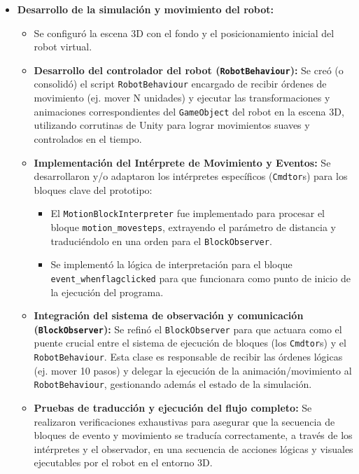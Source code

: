 \begin{itemize}
\begin{itemize}
	\item \textbf{Desarrollo de la simulación y movimiento del robot:}
	\begin{itemize}
		\item Se configuró la escena 3D con el fondo y el posicionamiento inicial del robot virtual. 
		\item \textbf{Desarrollo del controlador del robot (\texttt{RobotBehaviour}):} Se creó (o consolidó) el script \texttt{RobotBehaviour} encargado de recibir órdenes de movimiento (ej. mover N unidades) y ejecutar las transformaciones y animaciones correspondientes del \texttt{GameObject} del robot en la escena 3D, utilizando corrutinas de Unity para lograr movimientos suaves y controlados en el tiempo.
		\item \textbf{Implementación del Intérprete de Movimiento y Eventos:} Se desarrollaron y/o adaptaron los intérpretes específicos (\texttt{Cmdtor}s) para los bloques clave del prototipo:
		\begin{itemize}
			\item El \texttt{MotionBlockInterpreter} fue implementado para procesar el bloque \texttt{motion\_movesteps}, extrayendo el parámetro de distancia y traduciéndolo en una orden para el \texttt{BlockObserver}.
			\item Se implementó la lógica de interpretación para el bloque \texttt{event\_whenflagclicked} para que funcionara como punto de inicio de la ejecución del programa.
		\end{itemize}
		\item \textbf{Integración del sistema de observación y comunicación (\texttt{BlockObserver}):} Se refinó el \texttt{BlockObserver} para que actuara como el puente crucial entre el sistema de ejecución de bloques (los \texttt{Cmdtor}s) y el \texttt{RobotBehaviour}. Esta clase es responsable de recibir las órdenes lógicas (ej. mover 10 pasos) y delegar la ejecución de la animación/movimiento al \texttt{RobotBehaviour}, gestionando además el estado de la simulación.
		\item \textbf{Pruebas de traducción y ejecución del flujo completo:} Se realizaron verificaciones exhaustivas para asegurar que la secuencia de bloques de evento y movimiento se traducía correctamente, a través de los intérpretes y el observador, en una secuencia de acciones lógicas y visuales ejecutables por el robot en el entorno 3D.
	

\end{itemize}
\end{itemize}
\end{itemize}
